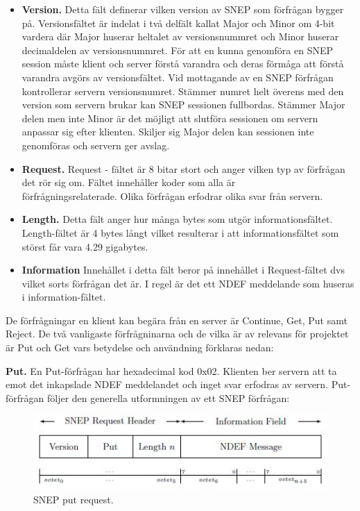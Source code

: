 \documentclass[11pt]{article}
\begin{document}
\begin{itemize}
\item \textbf{Version.} Detta fält definerar vilken version av SNEP som förfrågan bygger på. Versionsfältet är indelat i två delfält kallat Major och Minor om 4-bit vardera där Major huserar heltalet av versionsnummret och Minor huserar decimaldelen av versionsnummret. För att en kunna genomföra en SNEP session måste klient och server förstå varandra och deras förmåga att förstå varandra avgörs av versionsfältet. Vid mottagande av en SNEP förfrågan kontrollerar servern versionsnumret. Stämmer numret helt överens med den version som servern brukar kan SNEP sessionen fullbordas. Stämmer Major delen men inte Minor är det möjligt att slutföra sessionen om servern anpassar sig efter klienten. Skiljer sig Major delen kan sessionen inte genomföras och servern ger avslag.
\item \textbf{Request.} Request - fältet är 8 bitar stort och anger vilken typ av förfrågan det rör sig om. Fältet innehåller koder som alla är\\ förfrågningsrelaterade. Olika förfrågan erfodrar olika svar från servern.
\item \textbf{Length.} Detta fält anger hur många bytes som utgör informationsfältet. Length-fältet är 4 bytes långt vilket resulterar i att informationsfältet som störst får vara 4.29 gigabytes.
\item \textbf{Information} Innehållet i detta fält beror på innehållet i Request-fältet dvs vilket sorts förfrågan det är. I regel är det ett NDEF meddelande som huseras i information-fältet.
\end{itemize}

De förfrågningar en klient kan begära från en server är Continue, Get, Put samt Reject. De två vanligaste förfrågninarna och de vilka är av relevans för projektet är Put och Get vars betydelse och användning förklaras nedan:

\textbf{Put.} En Put-förfrågan har hexadecimal kod 0x02. Klienten ber servern att ta emot det inkapslade NDEF meddelandet och inget svar erfodras av servern.  Put-förfrågan följer den generella utformningen av ett SNEP förfrågan:

\begin{figure}[H]
\centering
\includegraphics[scale=0.8]{SNEP_put_request.jpg}
\caption{SNEP put request.}
\label{fig:SNEP_put_request}
\end{figure}
\end{document}
